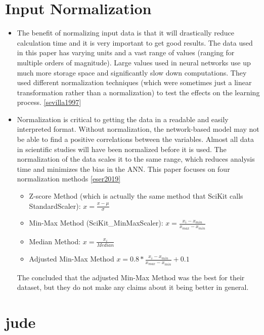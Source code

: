 \section{Input Normalization}\label{Input_Normalization}

\begin{itemize}
\item The benefit of normalizing input data is that it will drastically reduce calculation time and it is very important to get good results. The data used in this paper has varying units and a vast range of values (ranging for multiple orders of magnitude). Large values used in neural networks use up much more storage space and significantly slow down computations. They used different normalization techniques (which were sometimes just a linear transformation rather than a normalization) to test the effects on the learning process. \ref{sevilla1997}
\item Normalization is critical to getting the data in a readable and easily interpreted format. Without normalization, the network-based model may not be able to find a positive correlations between the variables. Almost all data in scientific studies will have been normalized before it is used. The normalization of the data scales it to the same range, which reduces analysis time and minimizes the bias in the ANN. This paper focuses on four normalization methods \ref{eser2019}
\begin{itemize}
\item Z-score Method (which is actually the same method that SciKit calls StandardScaler): $x=\frac{x-\mu}{\sigma}$
\item Min-Max Method (SciKit\_MinMaxScaler): $x = \frac{x_i-x_{min}}{x_{max}-x_{min}}$
\item Median Method: $x = \frac{x_i}{Median} $
\item Adjusted Min-Max Method $x = 0.8*\frac{x_i-x_{min}}{x_{max}-x_{min}} + 0.1$
\end{itemize}
The concluded that the adjusted Min-Max Method was the best for their dataset, but they do not make any claims about it being better in general.

\end{itemize}

\section{jude}

